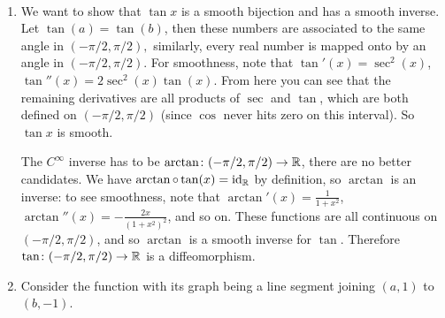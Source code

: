 \begin{solution}\,
\begin{enumerate}[label=(\alph*)]
    \item We want to show that $\tan x$ is a smooth bijection and has a smooth inverse. Let $\tan(a)=\tan(b)$, then these numbers are associated to the same angle in $(-\pi /2, \pi /2),$ similarly, every real number is mapped onto by an angle in $(- \pi/2, \pi /2)$. For smoothness, note that $\tan'(x)=\sec^2(x)$, $\tan ''(x)=2\sec ^2 (x)\tan(x)$. From here you can see that the remaining derivatives are all products of $\sec$ and $\tan$, which are both defined on $(-\pi /2, \pi /2)$ (since $\cos$ never hits zero on this interval). So $\tan x$ is smooth.

        The $C^{\infty}$ inverse has to be $\arctan \colon (-\pi /2, \pi /2)\to \mathbb{R}$, there are no better candidates. We have $\arctan \circ \tan (x)= \operatorname{id}_{\mathbb{R}}$ by definition, so $\arctan$ is an inverse: to see smoothness, note that $\arctan'(x)=\frac{1}{1+x^2}$, $\arctan''(x)=-\frac{2x}{(1+x^2)^2}$, and so on. These functions are all continuous on $(-\pi /2, \pi /2)$, and so $\arctan $ is a smooth inverse for $\tan$. Therefore $\tan \colon (- \pi /2, \pi /2) \to \mathbb{R}$ is a diffeomorphism.
    \item Consider the function with its graph being a line segment joining $(a,1)$ to $(b,-1)$.\qedhere
\end{enumerate}
\end{solution}



